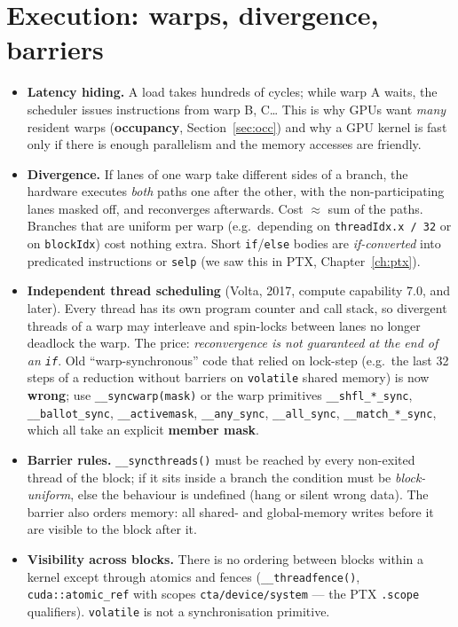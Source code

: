 \documentclass[10pt,a4paper,openany,oneside]{report}
\newcommand{\prio}[1]{\texorpdfstring{\ifcase#1\or{\color{gold}\ding{72}}\or{\color{gold}\ding{72}\ding{72}}\or{\color{gold}\ding{72}\ding{72}\ding{72}}\fi}{}}
\begin{document}
\section{Execution: warps, divergence, barriers \prio{3}}
\begin{itemize}[nosep]
\item \textbf{Latency hiding.} A load takes hundreds of cycles; while warp A waits, the scheduler issues instructions from warp B, C\ldots{} This is why GPUs want \emph{many} resident warps (\textbf{occupancy}, Section~\ref{sec:occ}) and why a GPU kernel is fast only if there is enough parallelism and the memory accesses are friendly.
\item \textbf{Divergence.} If lanes of one warp take different sides of a branch, the hardware executes \emph{both} paths one after the other, with the non-participating lanes masked off, and reconverges afterwards. Cost $\approx$ sum of the paths. Branches that are uniform per warp (e.g.\ depending on \texttt{threadIdx.x / 32} or on \texttt{blockIdx}) cost nothing extra. Short \texttt{if}/\texttt{else} bodies are \emph{if-converted} into predicated instructions or \texttt{selp} (we saw this in PTX, Chapter~\ref{ch:ptx}).
\item \textbf{Independent thread scheduling} (Volta, 2017, compute capability 7.0, and later). Every thread has its own program counter and call stack, so divergent threads of a warp may interleave and spin-locks between lanes no longer deadlock the warp. The price: \emph{reconvergence is not guaranteed at the end of an \texttt{if}}. Old ``warp-synchronous'' code that relied on lock-step (e.g.\ the last 32 steps of a reduction without barriers on \texttt{volatile} shared memory) is now \textbf{wrong}; use \texttt{\_\_syncwarp(mask)} or the warp primitives \texttt{\_\_shfl\_*\_sync}, \texttt{\_\_ballot\_sync}, \texttt{\_\_activemask}, \texttt{\_\_any\_sync}, \texttt{\_\_all\_sync}, \texttt{\_\_match\_*\_sync}, which all take an explicit \textbf{member mask}.
\item \textbf{Barrier rules.} \texttt{\_\_syncthreads()} must be reached by every non-exited thread of the block; if it sits inside a branch the condition must be \emph{block-uniform}, else the behaviour is undefined (hang or silent wrong data). The barrier also orders memory: all shared- and global-memory writes before it are visible to the block after it.
\item \textbf{Visibility across blocks.} There is no ordering between blocks within a kernel except through atomics and fences (\texttt{\_\_threadfence()}, \texttt{cuda::atomic\_ref} with scopes \texttt{cta/device/system} --- the PTX \texttt{.scope} qualifiers). \texttt{volatile} is not a synchronisation primitive.
\end{itemize}
\end{document}
